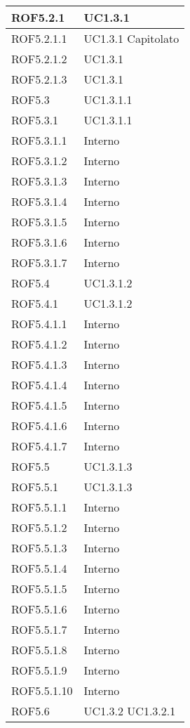 \begin{center}
\begin{longtable}{| p{4cm} | p{4cm} |}
\hline
ROF5.2.1   &  UC1.3.1 \\
\hline
ROF5.2.1.1   &  UC1.3.1 \newline Capitolato \\
\hline
ROF5.2.1.2   &  UC1.3.1 \\
\hline
ROF5.2.1.3   &  UC1.3.1 \\
\hline
ROF5.3   &  UC1.3.1.1 \\
\hline
ROF5.3.1   &  UC1.3.1.1  \\
\hline
ROF5.3.1.1   &  Interno \\
\hline
ROF5.3.1.2   &  Interno \\
\hline
ROF5.3.1.3   &  Interno \\
\hline
ROF5.3.1.4   &  Interno \\
\hline
ROF5.3.1.5   &  Interno \\
\hline
ROF5.3.1.6   &  Interno \\
\hline
ROF5.3.1.7   &  Interno \\
\hline
ROF5.4   &  UC1.3.1.2  \\
\hline
ROF5.4.1   &  UC1.3.1.2  \\
\hline
ROF5.4.1.1   &  Interno \\
\hline
ROF5.4.1.2   &  Interno \\
\hline
ROF5.4.1.3   &  Interno \\
\hline
ROF5.4.1.4   &  Interno \\
\hline
ROF5.4.1.5   &  Interno \\
\hline
ROF5.4.1.6   &  Interno \\
\hline
ROF5.4.1.7   &  Interno \\
\hline
ROF5.5   &  UC1.3.1.3  \\
\hline
ROF5.5.1   &  UC1.3.1.3 \\
\hline
ROF5.5.1.1   &  Interno \\
\hline
ROF5.5.1.2   &  Interno \\
\hline
ROF5.5.1.3   &  Interno \\
\hline
ROF5.5.1.4   &  Interno \\
\hline
ROF5.5.1.5   &  Interno \\
\hline
ROF5.5.1.6   &  Interno \\
\hline
ROF5.5.1.7   &  Interno \\
\hline
ROF5.5.1.8   &  Interno \\
\hline
ROF5.5.1.9   &  Interno \\
\hline
ROF5.5.1.10   &  Interno \\
\hline
ROF5.6   &  UC1.3.2 \newline UC1.3.2.1 \\

\end{longtable}
\end{center}
